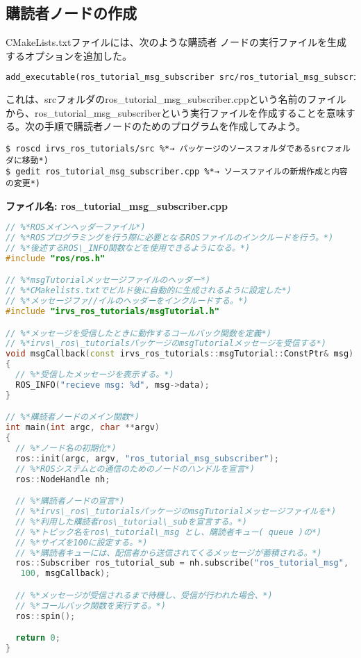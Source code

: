 \subsection{購読者ノードの作成}
CMakeLists.txtファイルには、次のような購読者 ノードの実行ファイルを生成するオプションを追加した。

\begin{lstlisting}[language=make]
add_executable(ros_tutorial_msg_subscriber src/ros_tutorial_msg_subscriber.cpp)
\end{lstlisting}

これは、srcフォルダのros\_tutorial\_msg\_subscriber.cppという名前のファイルから、ros\_tutorial\_msg\_subscriberという実行ファイルを作成することを意味する。次の手順で購読者ノードのためのプログラムを作成してみよう。

\begin{lstlisting}[language=ROS]
$ roscd irvs_ros_tutorials/src %*→ パッケージのソースフォルダであるsrcフォルダに移動*)
$ gedit ros_tutorial_msg_subscriber.cpp %*→ ソースファイルの新規作成と内容の変更*)
\end{lstlisting}

\noindent\textbf{ファイル名: ros\_tutorial\_msg\_subscriber.cpp}
\begin{lstlisting}[language=C++]
// %*ROSメインヘッダーファイル*)
// %*ROSプログラミングを行う際に必要となるROSファイルのインクルードを行う。*)
// %*後述するROS\_INFO関数などを使用できるようになる。*)
#include "ros/ros.h"

// %*msgTutorialメッセージファイルのヘッダー*)
// %*CMakelists.txtでビルド後に自動的に生成されるように設定した*)
// %*メッセージファ//イルのヘッダーをインクルードする。*)
#include "irvs_ros_tutorials/msgTutorial.h"

// %*メッセージを受信したときに動作するコールバック関数を定義*)
// %*irvs\_ros\_tutorialsパッケージのmsgTutorialメッセージを受信する*)
void msgCallback(const irvs_ros_tutorials::msgTutorial::ConstPtr& msg)
{
  // %*受信したメッセージを表示する。*)
  ROS_INFO("recieve msg: %d", msg->data);
}

// %*購読者ノードのメイン関数*)
int main(int argc, char **argv)
{
  // %*ノード名の初期化*)
  ros::init(argc, argv, "ros_tutorial_msg_subscriber");
  // %*ROSシステムとの通信のためのノードのハンドルを宣言*)
  ros::NodeHandle nh;

  // %*購読者ノードの宣言*)
  // %*irvs\_ros\_tutorialsパッケージのmsgTutorialメッセージファイルを*)
  // %*利用した購読者ros\_tutorial\_subを宣言する。*)
  // %*トピック名をros\_tutorial\_msg とし、購読者キュー( queue )の*)
  // %*サイズを100に設定する。*)
  // %*購読者キューには、配信者から送信されてくるメッセージが蓄積される。*)
  ros::Subscriber ros_tutorial_sub = nh.subscribe("ros_tutorial_msg",
   100, msgCallback);

  // %*メッセージが受信されるまで待機し、受信が行われた場合、*)
  // %*コールバック関数を実行する。*)
  ros::spin();

  return 0;
}
\end{lstlisting}

